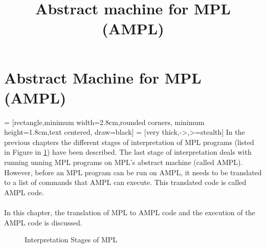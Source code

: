 \documentclass[11pt]{article}
\title{Abstract machine for MPL (AMPL)}
\newcommand{\<}{\langle}
\renewcommand{\>}{\rangle}
\begin{document}
\maketitle
\section {Abstract Machine for MPL (AMPL)}
 = [rectangle,minimum width=2.8cm,rounded corners,
                     minimum height=1.8cm,text centered, draw=black]
 = [very thick,->,>=stealth]
In the previous chapters the different stages of interpretation of MPL programs (listed in Figure in \ref {fig:CSAM}) have been described. The last stage of interpretation deals with running unning MPL programs on MPL's abstract machine (called AMPL). However, before an MPL program can be run on AMPL, it needs to be translated to a list of commands that AMPL can execute. This translated code is called AMPL code.
~~\\~~\\ 
In this chapter, the translation of MPL to AMPL code and the execution of the AMPL code is discussed.

\begin{figure}[h!]
\begin {center}
\caption{Interpretation Stages of MPL} \label{fig:CSAM}
\end{center}
\end{figure}
\end{document}

